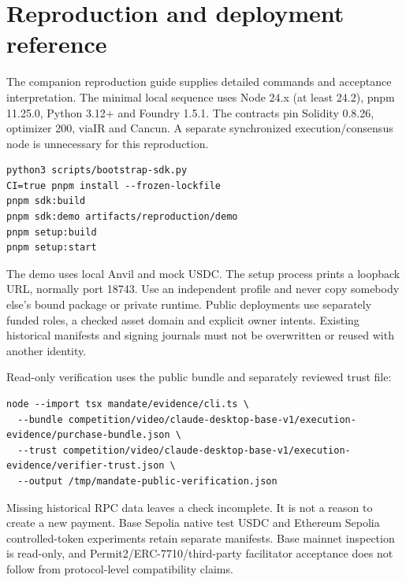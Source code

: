 \section{Reproduction and deployment reference}\label{app:reproduction}
The companion reproduction guide supplies detailed commands and acceptance interpretation. The minimal local sequence uses Node 24.x (at least 24.2), pnpm 11.25.0, Python 3.12+ and Foundry 1.5.1. The contracts pin Solidity 0.8.26, optimizer 200, viaIR and Cancun. A separate synchronized execution/consensus node is unnecessary for this reproduction.
\begin{lstlisting}
python3 scripts/bootstrap-sdk.py
CI=true pnpm install --frozen-lockfile
pnpm sdk:build
pnpm sdk:demo artifacts/reproduction/demo
pnpm setup:build
pnpm setup:start
\end{lstlisting}
The demo uses local Anvil and mock USDC. The setup process prints a loopback URL, normally port 18743. Use an independent profile and never copy somebody else's bound package or private runtime. Public deployments use separately funded roles, a checked asset domain and explicit owner intents. Existing historical manifests and signing journals must not be overwritten or reused with another identity.

Read-only verification uses the public bundle and separately reviewed trust file:
\begin{lstlisting}
node --import tsx mandate/evidence/cli.ts \
  --bundle competition/video/claude-desktop-base-v1/execution-evidence/purchase-bundle.json \
  --trust competition/video/claude-desktop-base-v1/execution-evidence/verifier-trust.json \
  --output /tmp/mandate-public-verification.json
\end{lstlisting}
Missing historical RPC data leaves a check incomplete. It is not a reason to create a new payment. Base Sepolia native test USDC and Ethereum Sepolia controlled-token experiments retain separate manifests. Base mainnet inspection is read-only, and Permit2/ERC-7710/third-party facilitator acceptance does not follow from protocol-level compatibility claims.
